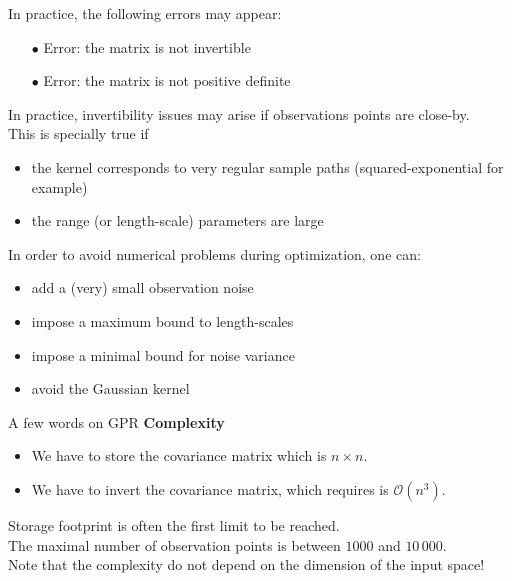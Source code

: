 \documentclass{beamer}
\begin{document}
\begin{frame}{}
In practice, the following errors may appear:\\
\begin{itemize}
	\item[\alert{$\bullet$}] \alert{Error: the matrix is not invertible}
	\item[\alert{$\bullet$}] \alert{Error: the matrix is not positive definite}
\end{itemize}
In practice, invertibility issues may arise if observations points are close-by. \\
\vspace{3mm}
This is specially true if
\begin{itemize}
	\item the kernel corresponds to very regular sample paths (squared-exponential for example)
	\item the range (or length-scale) parameters are large
\end{itemize}
\vspace{3mm}
In order to avoid numerical problems during optimization, one can:
\begin{itemize}
	\item add a (very) small observation noise\\
	\item impose a maximum bound to length-scales
	\item impose a minimal bound for noise variance 
	\item avoid the Gaussian kernel
\end{itemize}
\end{frame}

\begin{frame}{}
A few words on GPR \textbf{Complexity}\\ \vspace{2mm}
	\begin{itemize}
  		\item {} We have to store the covariance matrix which is $n \times n$.
  		\item {} We have to invert the covariance matrix, which requires is $\mathcal{O}(n^3)$.\\
	\end{itemize}
Storage footprint is often the first limit to be reached.\\
\vspace{5mm}
The maximal number of observation points is between $1000$ and $10\,000$.\\
\vspace{2mm}
Note that the complexity do not depend on the dimension of the input space!
\end{frame}
\end{document}
